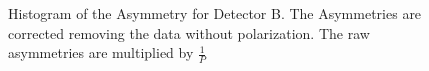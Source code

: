\begin{figure}[!ht]
\caption{Histogram of the Asymmetry for Detector B. The Asymmetries are corrected removing the data without polarization. The raw asymmetries are multiplied by $\frac{1}{P}$}
\label{fig:AsymmtriesB0B1B2}
\end{figure}


\begin{figure}[!ht]
\captionsetup[subfloat]{farskip=1pt,captionskip=1pt}
\centering
{}
\\ 

\end{figure}
